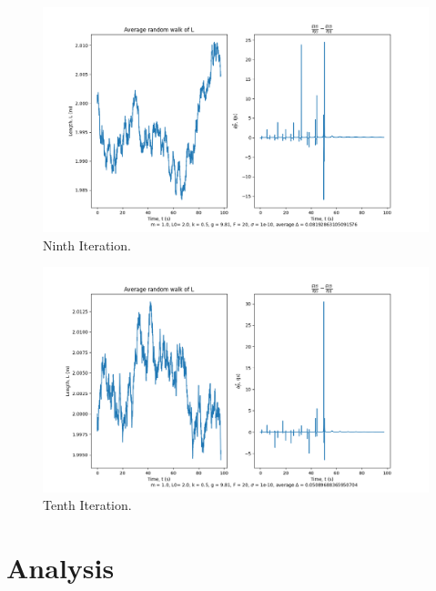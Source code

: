 \documentclass[10pt, twocolumn]{article}
\begin{document}
\begin{figure}[H]
    \centering
    \includegraphics[width = \columnwidth]{Projects/ForcedSimplePendulum/Plots/simplified m = 1.0, L0= 2.0, k = 0.5, g = 9.81, F = 20, sigma = 1e-10, run number 8.png}
    \caption{Ninth Iteration.}
    \label{fig:enter-label}
\end{figure}

\begin{figure}[H]
    \centering
    \includegraphics[width = \columnwidth]{Projects/ForcedSimplePendulum/Plots/simplified m = 1.0, L0= 2.0, k = 0.5, g = 9.81, F = 20, sigma = 1e-10, run number 9.png}
    \caption{Tenth Iteration.}
    \label{fig:enter-label}
\end{figure}

\twocolumn
\section{Analysis}{\label{analysis}}
\end{document}
